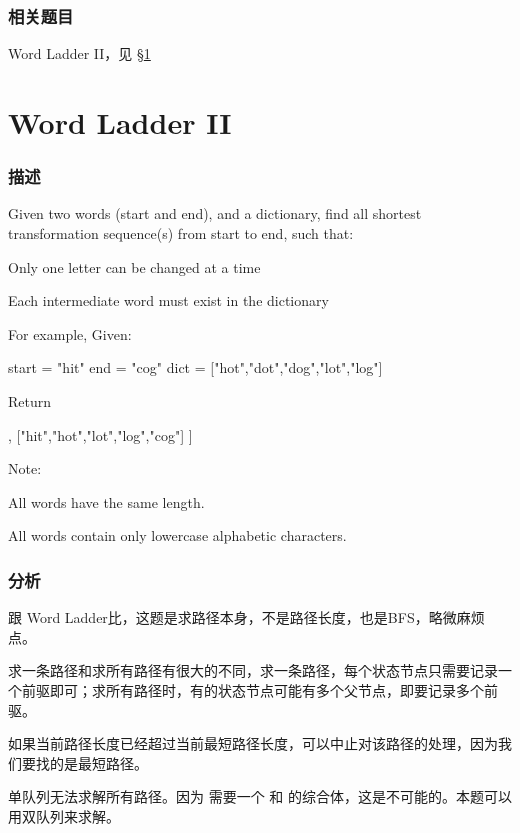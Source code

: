 \subsubsection{相关题目}

\begindot
\item Word Ladder II，见 \S \ref{sec:word-ladder-ii}
\myenddot


\section{Word Ladder II} %
\label{sec:word-ladder-ii}


\subsubsection{描述}
Given two words (start and end), and a dictionary, find all shortest transformation sequence(s) from start to end, such that:
\begindot
\item Only one letter can be changed at a time
\item Each intermediate word must exist in the dictionary
\myenddot

For example, Given:
\begin{Code}
start = "hit"
end = "cog"
dict = ["hot","dot","dog","lot","log"]
\end{Code}
Return
\begin{Code}
[
    ["hit","hot","dot","dog","cog"],
    ["hit","hot","lot","log","cog"]
]
\end{Code}

Note:
\begindot
\item All words have the same length.
\item All words contain only lowercase alphabetic characters.
\myenddot


\subsubsection{分析}
跟 Word Ladder比，这题是求路径本身，不是路径长度，也是BFS，略微麻烦点。

求一条路径和求所有路径有很大的不同，求一条路径，每个状态节点只需要记录一个前驱即可；求所有路径时，有的状态节点可能有多个父节点，即要记录多个前驱。

如果当前路径长度已经超过当前最短路径长度，可以中止对该路径的处理，因为我们要找的是最短路径。

单队列无法求解所有路径。因为 需要一个  和  的综合体，这是不可能的。本题可以用双队列来求解。


